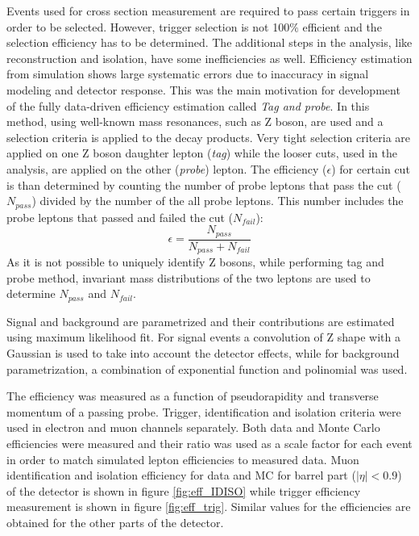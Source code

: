 Events used for cross section measurement are required to pass certain triggers in order to be selected. However, trigger selection is not 100$\%$ efficient and the selection efficiency has to be determined. The additional steps in the analysis, like reconstruction and isolation, have some inefficiencies as well. Efficiency estimation from simulation shows large systematic errors due to inaccuracy in signal modeling and detector response. This was the main motivation for development of the fully data-driven efficiency estimation called \textit{Tag and probe}. In this method, using well-known mass resonances, such as Z boson, are used and a selection criteria is applied to the decay products. 
Very tight selection criteria are applied on one Z boson daughter lepton (\textit{tag}) while the looser cuts, used in the analysis, are applied on the other (\textit{probe}) lepton. The efficiency ($\epsilon$) for certain cut is than determined by counting the number of probe leptons that pass the cut ($N_{pass}$) divided by the number of the all probe leptons. This number includes the probe leptons that passed and failed the cut ($N_{fail}$):    
\begin{equation}
\epsilon = \frac{N_{pass}}{N_{pass}+N_{fail}}
\end{equation} 
As it is not possible to uniquely identify Z bosons, while performing tag and probe method, invariant mass distributions of the two leptons are used to determine $N_{pass}$ and $N_{fail}$. 
  
Signal and background are parametrized and their contributions are estimated using maximum likelihood fit. For signal events a convolution of Z shape with a Gaussian is used to take into account the detector effects, while for background parametrization, a combination of exponential function and polinomial was used.
\par The efficiency was measured as a function of pseudorapidity and transverse momentum of a passing probe. Trigger, identification and isolation criteria were used in electron and muon channels separately. Both data and Monte Carlo efficiencies were measured and their ratio was used as a scale factor for each event in order to match simulated lepton efficiencies to measured data. Muon identification and isolation efficiency for data and MC for barrel part ($|\eta|<0.9$) of the detector is shown in figure \ref{fig:eff_IDISO} while trigger efficiency measurement is shown in figure \ref{fig:eff_trig}. Similar values for the efficiencies are obtained for the other parts of the detector.

